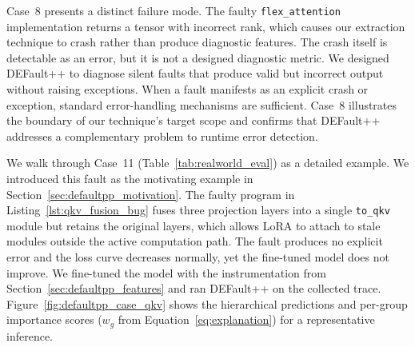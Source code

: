 Case~8 presents a distinct failure mode. The faulty \texttt{flex\_attention} implementation returns a tensor with incorrect rank, which causes our extraction technique to crash rather than produce diagnostic features. The crash itself is detectable as an error, but it is not a designed diagnostic metric. We designed DEFault++ to diagnose silent faults that produce valid but incorrect output without raising exceptions. When a fault manifests as an explicit crash or exception, standard error-handling mechanisms are sufficient. Case~8 illustrates the boundary of our technique's target scope and confirms that DEFault++ addresses a complementary problem to runtime error detection.

We walk through Case~11 (Table~\ref{tab:realworld_eval}) as a detailed example. We introduced this fault as the motivating example in Section~\ref{sec:defaultpp_motivation}. The faulty program in Listing~\ref{lst:qkv_fusion_bug} fuses three projection layers into a single \texttt{to\_qkv} module but retains the original layers, which allows LoRA to attach to stale modules outside the active computation path. The fault produces no explicit error and the loss curve decreases normally, yet the fine-tuned model does not improve. We fine-tuned the model with the instrumentation from Section~\ref{sec:defaultpp_features} and ran DEFault++ on the collected trace. Figure~\ref{fig:defaultpp_case_qkv} shows the hierarchical predictions and per-group importance scores ($w_g$ from Equation~\ref{eq:explanation}) for a representative inference.

